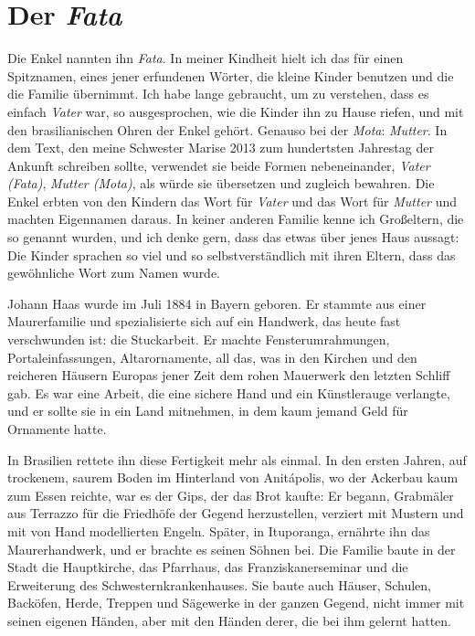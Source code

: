 \documentclass[
  ngerman,
  11pt,
  openany]{book}
\begin{document}
\section{\texorpdfstring{Der \emph{Fata}}{Der Fata}}\label{der-fata}

Die Enkel nannten ihn \emph{Fata}. In meiner Kindheit hielt ich das für
einen Spitznamen, eines jener erfundenen Wörter, die kleine Kinder
benutzen und die die Familie übernimmt. Ich habe lange gebraucht, um zu
verstehen, dass es einfach \emph{Vater} war, so ausgesprochen, wie die
Kinder ihn zu Hause riefen, und mit den brasilianischen Ohren der Enkel
gehört. Genauso bei der \emph{Mota}: \emph{Mutter}. In dem Text, den
meine Schwester Marise 2013 zum hundertsten Jahrestag der Ankunft
schreiben sollte, verwendet sie beide Formen nebeneinander, \emph{Vater
(Fata)}, \emph{Mutter (Mota)}, als würde sie übersetzen und zugleich
bewahren. Die Enkel erbten von den Kindern das Wort für \emph{Vater} und
das Wort für \emph{Mutter} und machten Eigennamen daraus. In keiner
anderen Familie kenne ich Großeltern, die so genannt wurden, und ich
denke gern, dass das etwas über jenes Haus aussagt: Die Kinder sprachen
so viel und so selbstverständlich mit ihren Eltern, dass das gewöhnliche
Wort zum Namen wurde.

Johann Haas wurde im Juli 1884 in Bayern geboren. Er stammte aus einer
Maurerfamilie und spezialisierte sich auf ein Handwerk, das heute fast
verschwunden ist: die Stuckarbeit. Er machte Fensterumrahmungen,
Portaleinfassungen, Altarornamente, all das, was in den Kirchen und den
reicheren Häusern Europas jener Zeit dem rohen Mauerwerk den letzten
Schliff gab. Es war eine Arbeit, die eine sichere Hand und ein
Künstlerauge verlangte, und er sollte sie in ein Land mitnehmen, in dem
kaum jemand Geld für Ornamente hatte.

In Brasilien rettete ihn diese Fertigkeit mehr als einmal. In den ersten
Jahren, auf trockenem, saurem Boden im Hinterland von Anitápolis, wo der
Ackerbau kaum zum Essen reichte, war es der Gips, der das Brot kaufte:
Er begann, Grabmäler aus Terrazzo für die Friedhöfe der Gegend
herzustellen, verziert mit Mustern und mit von Hand modellierten Engeln.
Später, in Ituporanga, ernährte ihn das Maurerhandwerk, und er brachte
es seinen Söhnen bei. Die Familie baute in der Stadt die Hauptkirche,
das Pfarrhaus, das Franziskanerseminar und die Erweiterung des
Schwesternkrankenhauses. Sie baute auch Häuser, Schulen, Backöfen,
Herde, Treppen und Sägewerke in der ganzen Gegend, nicht immer mit
seinen eigenen Händen, aber mit den Händen derer, die bei ihm gelernt
hatten.
\end{document}
